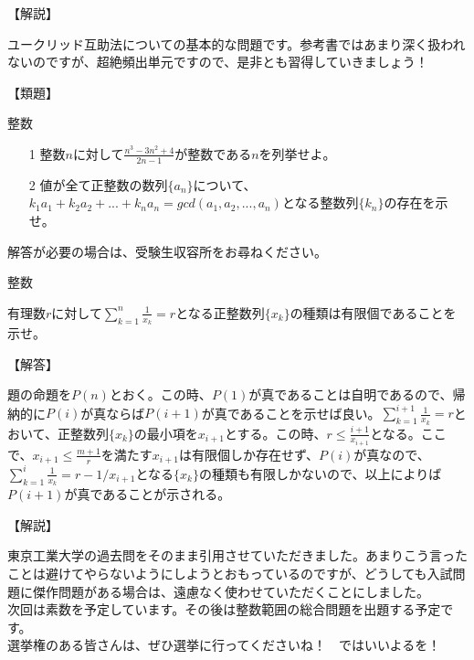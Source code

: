 \documentclass[a4paper,fleqn,dvipdfmx]{jsarticle}
\begin{document}
\begin{flushleft}
【解説】
\end{flushleft}

ユークリッド互助法についての基本的な問題です。参考書ではあまり深く扱われないのですが、超絶頻出単元ですので、是非とも習得していきましょう！


\begin{flushleft}
【類題】
\end{flushleft}

\begin{itembox}[l]{整数}

\begin{itemize}
    \item [1] 
    整数$n$に対して$\frac{n^3-3n^2+4}{2n-1}$が整数である$n$を列挙せよ。
    \item [2] 
    値が全て正整数の数列$\{a_n\}$について、$k_1a_1+k_2a_2+...+k_na_n=gcd(a_1,a_2,...,a_n)$となる整数列$\{k_n\}$の存在を示せ。
\end{itemize}

\end{itembox}
解答が必要の場合は、受験生収容所をお尋ねください。



\newpage


\begin{itembox}[l]{整数}

    有理数$r$に対して$\sum_{k=1}^n \frac{1}{x_k}=r$となる正整数列$\{x_k\}$の種類は有限個であることを示せ。

\end{itembox}


\begin{flushleft}
【解答】
\end{flushleft}

    題の命題を$P(n)$とおく。この時、$P(1)$が真であることは自明であるので、帰納的に$P(i)$が真ならば$P(i+1)$が真であることを示せば良い。$\sum_{k=1}^{i+1} \frac{1}{x_k}=r$とおいて、正整数列$\{x_k\}$の最小項を$x_{i+1}$とする。この時、$r\leq \frac{i+1}{x_{i+1}}$となる。ここで、$x_{i+1}\leq \frac{m+1}{r}$を満たす$x_{i+1}$は有限個しか存在せず、$P(i)$が真なので、$\sum_{k=1}^{i} \frac{1}{x_k}=r−1/x_{i+1}$となる$\{x_k\}$の種類も有限しかないので、以上によりば$P(i+1)$が真であることが示される。


\begin{flushleft}
【解説】
\end{flushleft}

東京工業大学の過去問をそのまま引用させていただきました。あまりこう言ったことは避けてやらないようにしようとおもっているのですが、どうしても入試問題に傑作問題がある場合は、遠慮なく使わせていただくことにしました。\\
次回は素数を予定しています。その後は整数範囲の総合問題を出題する予定です。\\
選挙権のある皆さんは、ぜひ選挙に行ってくださいね！　ではいいよるを！
\end{document}
